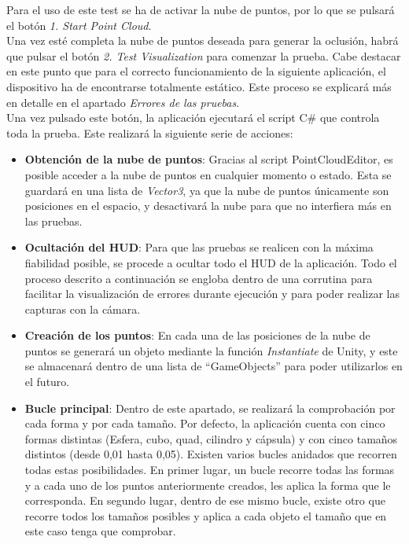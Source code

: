 \begin{itemize}
    Para el uso de este test se ha de activar la nube de puntos, por lo que se pulsará el botón \textit{1. Start Point Cloud}.\\ 
        
    Una vez esté completa la nube de puntos deseada para generar la oclusión, habrá que pulsar el botón \textit{2. Test Visualization} para comenzar la prueba. Cabe destacar en este punto que para el correcto funcionamiento de la siguiente aplicación, el dispositivo ha de encontrarse totalmente estático. Este proceso se explicará más en detalle en el apartado \textit{Errores de las pruebas}.\\
    
    Una vez pulsado este botón, la aplicación ejecutará el script C\# que controla toda la prueba. Este realizará la siguiente serie de acciones:
        
         \begin{itemize}
            \item \textbf{Obtención de la nube de puntos}: Gracias al script PointCloudEditor, es posible acceder a la nube de puntos en cualquier momento o estado. Esta se guardará en una lista de \textit{Vector3}, ya que la nube de puntos únicamente son posiciones en el espacio, y desactivará la nube para que no interfiera más en las pruebas.
         
            \item \textbf{Ocultación del HUD}: Para que las pruebas se realicen con la máxima fiabilidad posible, se procede a ocultar todo el HUD de la aplicación.
            Todo el proceso descrito a continuación se engloba dentro de una corrutina para facilitar la visualización de errores durante ejecución y para poder realizar las capturas con la cámara.
          
            \item \textbf{Creación de los puntos}: En cada una de las posiciones de la nube de puntos se generará un objeto mediante la función \textit{Instantiate} de Unity, y este se almacenará dentro de una lista de ``GameObjects'' para poder utilizarlos en el futuro.
            
            \item \textbf{Bucle principal}: Dentro de este apartado, se realizará la comprobación por cada forma y por cada tamaño. Por defecto, la aplicación cuenta con cinco formas distintas (Esfera, cubo, quad, cilindro y cápsula) y con cinco tamaños distintos (desde 0,01 hasta 0,05). Existen varios bucles anidados que recorren todas estas posibilidades. En primer lugar, un bucle recorre todas las formas y a cada uno de los puntos anteriormente creados, les aplica la forma que le corresponda. En segundo lugar, dentro de ese mismo bucle, existe otro que recorre todos los tamaños posibles y aplica a cada objeto el tamaño que en este caso tenga que comprobar.
             

\end{itemize}
\end{itemize}
